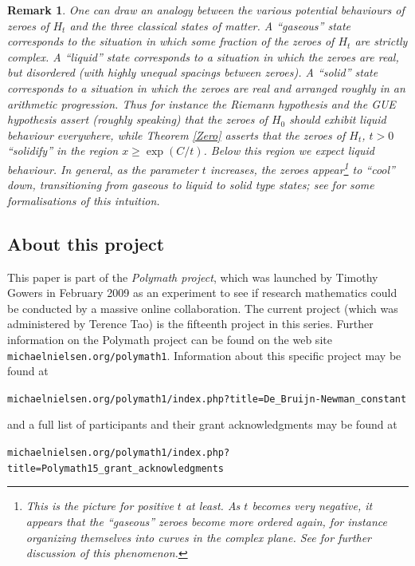 \documentclass[a4paper,11pt,twoside]{amsart}
\newtheorem{remark}[theorem]{Remark}
\begin{document}
\begin{remark}  One can draw an analogy between the various potential behaviours of zeroes of $H_t$ and the three classical states of matter.  A ``gaseous'' state corresponds to the situation in which some fraction of the zeroes of $H_t$ are strictly complex.  A ``liquid'' state corresponds to a situation in which the zeroes are real, but disordered (with highly unequal spacings between zeroes).  A ``solid'' state corresponds to a situation in which the zeroes are real and arranged roughly in an arithmetic progression.  Thus for instance the Riemann hypothesis and the GUE hypothesis assert (roughly speaking) that the zeroes of $H_0$ should exhibit liquid behaviour everywhere, while Theorem \ref{Zero} asserts that the zeroes of $H_t$, $t>0$ ``solidify'' in the region $x \geq \exp(C/t)$.  Below this region we expect liquid behaviour.  In general, as the parameter $t$ increases, the zeroes appear\footnote{This is the picture for positive $t$ at least.  As $t$ becomes very negative, it appears that the ``gaseous'' zeroes become more ordered again, for instance organizing themselves into curves in the complex plane.  See \cite{sharkfin} for further discussion of this phenomenon.} to ``cool'' down, transitioning from gaseous to liquid to solid type states; see \cite{brad} for some formalisations of this intuition. 
\end{remark}

\subsection{About this project}

This paper is part of the \emph{Polymath project}, which was launched
by Timothy Gowers in February 2009 as an experiment to see if research
mathematics could be conducted by a massive online collaboration.
The current project (which was administered by Terence Tao) is the fifteenth
project in this series.  Further information on the Polymath project can be
found on the web site {\tt michaelnielsen.org/polymath1}.  Information
about this specific project may be found at
\begin{center}
\small{{\tt michaelnielsen.org/polymath1/index.php?title=De\_Bruijn-Newman\_constant}}
\end{center}
and a full list of participants and their grant acknowledgments may be
found at
\begin{center}
\small{{\tt michaelnielsen.org/polymath1/index.php?title=Polymath15\_grant\_acknowledgments}}
\end{center}
\end{document}
